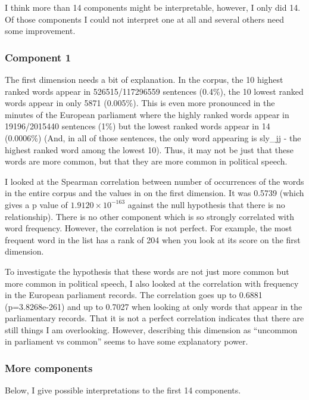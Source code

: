 \documentclass[10pt,letterpaper]{book}
\begin{document}
I think more than 14 components might be interpretable, however, I only did 14. 
Of those components I could not interpret one at all and several others need 
some improvement. 

\subsubsection{Component 1}

The first dimension needs a bit of explanation. In the corpus, the 10 highest 
ranked words appear in 526515/117296559 sentences (0.4\%), the 10 lowest 
ranked words appear in only 5871 (0.005\%). This is even more pronounced in the 
minutes of the European parliament where the highly ranked words appear in 
19196/2015440 sentences (1\%) but the lowest ranked words appear in 14 
(0.0006\%) (And, in all of those sentences, the only word appearing is 
sly\_jj - the highest ranked word among the lowest 10). Thus, it may not be 
just that these words are more common, but that they are more common in 
political speech.

I looked at the Spearman correlation between number of occurrences of the words 
in the entire corpus and the values in on the first dimension. It was 0.5739 
(which gives a p value of $1.9120 \times 10^{-163}$ against the null hypothesis 
that there is no relationship). There is no other component which is so 
strongly correlated with word frequency. However, the correlation is not 
perfect. For example, the most frequent word in the list has a rank of 204 when 
you look at its score on the first dimension.

To investigate the hypothesis that these words are not just more common but 
more common in political speech, I also looked at the correlation with 
frequency in the European parliament records. The correlation goes up to 0.6881 
(p=3.8268e-261) and up to 0.7027 when looking at only words that appear in the 
parliamentary records. That it is not a perfect correlation indicates that 
there are still things I am overlooking. However, describing this dimension as 
``uncommon in parliament vs common'' seems to have some explanatory power.

\subsubsection{More components}

Below, I give possible interpretations to the first 14 components.
\end{document}
